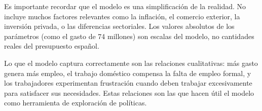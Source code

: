 Es importante recordar que el modelo es una simplificación de la realidad. No incluye muchos factores relevantes como la inflación, el comercio exterior, la inversión privada, o las diferencias sectoriales. Los valores absolutos de los parámetros (como el gasto de 74 millones) son escalas del modelo, no cantidades reales del presupuesto español.

Lo que el modelo captura correctamente son las relaciones cualitativas: más gasto genera más empleo, el trabajo doméstico compensa la falta de empleo formal, y los trabajadores experimentan frustración cuando deben trabajar excesivamente para satisfacer sus necesidades. Estas relaciones son las que hacen útil el modelo como herramienta de exploración de políticas.
